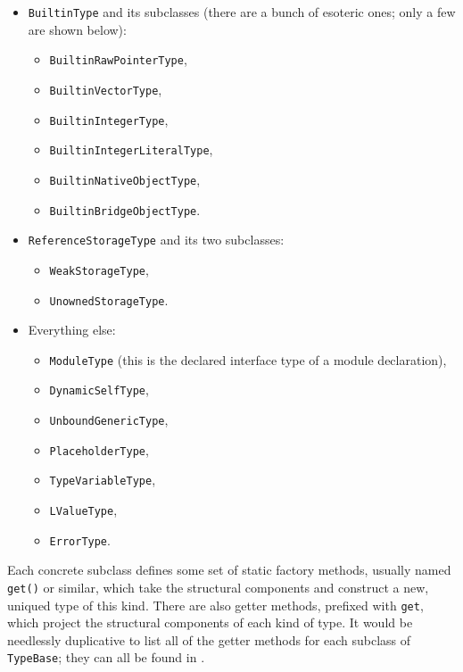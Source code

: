 \documentclass[../generics]{subfiles}
\begin{document}
\begin{itemize}
\begin{itemize}
\item {}\texttt{TypeAliasType},
\item {}\texttt{OptionalType},
\item {}\texttt{ArrayType},
\item {}\texttt{DictionaryType}.
\end{itemize}
\item \texttt{BuiltinType} and its subclasses (there are a bunch of esoteric ones; only a few are shown below):
\begin{itemize}
\item \texttt{BuiltinRawPointerType},
\item \texttt{BuiltinVectorType},
\item \texttt{BuiltinIntegerType},
\item \texttt{BuiltinIntegerLiteralType},
\item \texttt{BuiltinNativeObjectType},
\item \texttt{BuiltinBridgeObjectType}.
\end{itemize}
\item \texttt{ReferenceStorageType} and its two subclasses:
\begin{itemize}
\item \texttt{WeakStorageType},
\item \texttt{UnownedStorageType}.
\end{itemize}
\item Everything else:
\begin{itemize}
\item \texttt{ModuleType} (this is the declared interface type of a module declaration),
\item \texttt{DynamicSelfType},
\item \texttt{UnboundGenericType},
\item \texttt{PlaceholderType},
\item \texttt{TypeVariableType},
\item \texttt{LValueType},
\item \texttt{ErrorType}.
\end{itemize}
\end{itemize}
Each concrete subclass defines some set of static factory methods, usually named \texttt{get()} or similar, which take the structural components and construct a new, uniqued type of this kind. There are also getter methods, prefixed with \texttt{get}, which project the structural components of each kind of type. It would be needlessly duplicative to list all of the getter methods for each subclass of \texttt{TypeBase}; they can all be found in .
\end{document}
